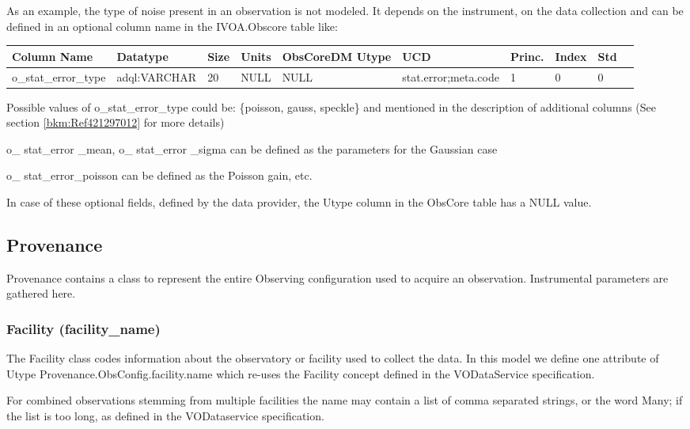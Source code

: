 \documentclass[11pt,a4paper]{ivoa}
\begin{document}
As an example, the type of noise present in an observation is not modeled. It depends on the instrument, on the data
collection and can be defined in an optional column name in the IVOA.Obscore table like:

\begin{tabular}{|l|p{}|p{}|p{}|p{}|
  p{}|p{}|p{}|p{}|p{}|}
\hline
Column Name & Datatype & Size & Units & ObsCoreDM Utype & UCD & Princ. & Index & Std\\\hline
o\_stat\_error\_type   & adql:VARCHAR   & 20 & NULL & NULL & stat.error;meta.code & 1 & 0 & 0\\\hline
\end{tabular}

Possible values of o\_stat\_error\_type could be: \{poisson, gauss, speckle\} and mentioned in the description of
additional columns (See section \ref{bkm:Ref421297012} for more details)

o\_ stat\_error \_mean, o\_ stat\_error \_sigma can be defined as the parameters for the Gaussian case

o\_ stat\_error\_poisson can be defined as the Poisson gain, etc.

In case of these optional fields, defined by the data provider, the Utype column in the ObsCore table has a NULL value.

\subsection{Provenance}
\label{bkm:Ref482804135}Provenance contains a class to represent the entire Observing configuration used to acquire an
observation.  Instrumental parameters are gathered here.

\subsubsection{Facility (facility\_name)}
The Facility class codes information about the observatory or facility used to collect the data. In this model we define
one attribute of Utype Provenance.ObsConfig.facility.name which re-uses the Facility concept defined in the
VODataService specification\cite{CITATIONVodatal1036}. 

 For combined observations stemming from multiple facilities the name may contain a list of comma separated strings, or
the word {\textquotedbl}Many{\textquotedbl}; if the list is too long, as defined in the VODataservice specification. 
\end{document}
